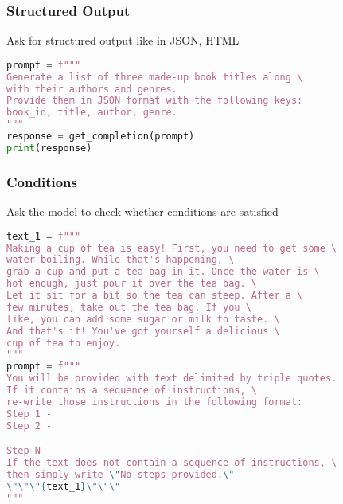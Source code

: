 \begin{frame}[fragile]\frametitle{Structured Output}

Ask for structured output like in JSON, HTML

\begin{lstlisting}[language=Python]
prompt = f"""
Generate a list of three made-up book titles along \ 
with their authors and genres. 
Provide them in JSON format with the following keys: 
book_id, title, author, genre.
"""
response = get_completion(prompt)
print(response)
\end{lstlisting}
		
		
\end{frame}


\begin{frame}[fragile]\frametitle{Conditions}

Ask the model to check whether conditions are satisfied

{\tiny
\begin{lstlisting}[language=Python]
text_1 = f"""
Making a cup of tea is easy! First, you need to get some \ 
water boiling. While that's happening, \ 
grab a cup and put a tea bag in it. Once the water is \ 
hot enough, just pour it over the tea bag. \ 
Let it sit for a bit so the tea can steep. After a \ 
few minutes, take out the tea bag. If you \ 
like, you can add some sugar or milk to taste. \ 
And that's it! You've got yourself a delicious \ 
cup of tea to enjoy.
"""
prompt = f"""
You will be provided with text delimited by triple quotes. 
If it contains a sequence of instructions, \ 
re-write those instructions in the following format:
Step 1 -
Step 2 -

Step N -
If the text does not contain a sequence of instructions, \ 
then simply write \"No steps provided.\"
\"\"\"{text_1}\"\"\"
"""
\end{lstlisting}
}
		
\end{frame}


